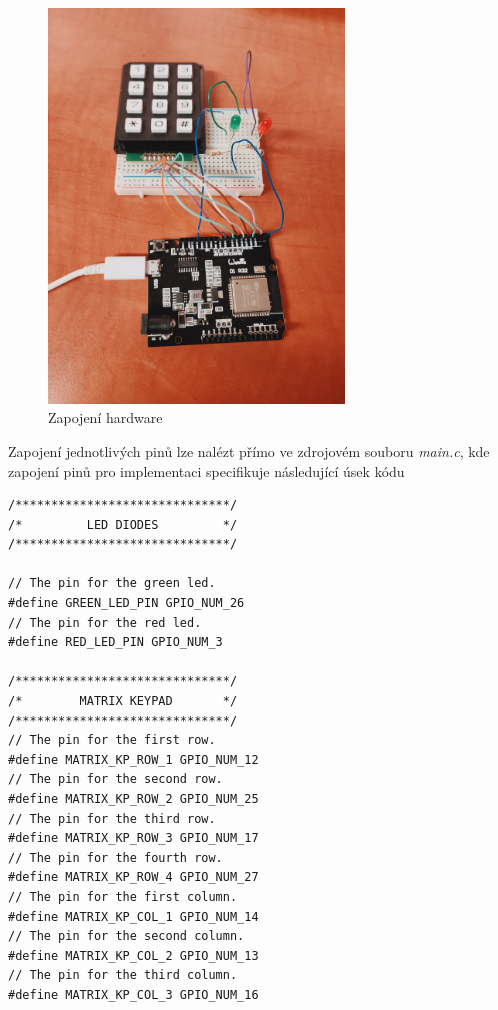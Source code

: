 \documentclass[a4paper, 12pt]{article}
\begin{document}
\begin{figure}[!htbp]
    \begin{center}
        \includegraphics[width=0.7\textwidth]{images/hardware.jpg}
        \caption{Zapojení hardware}
    \end{center}
\end{figure}
\FloatBarrier

\newpage

Zapojení jednotlivých pinů lze nalézt přímo ve zdrojovém souboru \textit{main.c}, kde zapojení pinů pro implementaci specifikuje následující úsek kódu

\begin{lstlisting}[style=CLanguage]
/******************************/
/*         LED DIODES         */
/******************************/

// The pin for the green led.
#define GREEN_LED_PIN GPIO_NUM_26
// The pin for the red led.
#define RED_LED_PIN GPIO_NUM_3

/******************************/
/*        MATRIX KEYPAD       */
/******************************/
// The pin for the first row.
#define MATRIX_KP_ROW_1 GPIO_NUM_12
// The pin for the second row.
#define MATRIX_KP_ROW_2 GPIO_NUM_25
// The pin for the third row.
#define MATRIX_KP_ROW_3 GPIO_NUM_17
// The pin for the fourth row.
#define MATRIX_KP_ROW_4 GPIO_NUM_27
// The pin for the first column.
#define MATRIX_KP_COL_1 GPIO_NUM_14
// The pin for the second column.
#define MATRIX_KP_COL_2 GPIO_NUM_13
// The pin for the third column.
#define MATRIX_KP_COL_3 GPIO_NUM_16
\end{lstlisting}
\end{document}
